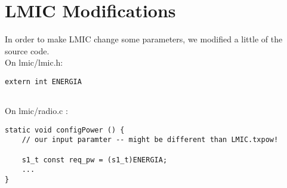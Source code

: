 
\chapter{LMIC Modifications} 
\label{chap:appendixA}



In order to make LMIC change some parameters, we modified a little of the source code.\\
On lmic/lmic.h:
\begin{verbatim}
extern int ENERGIA
    
\end{verbatim}

On lmic/radio.c :
\begin{verbatim}
static void configPower () {
    // our input paramter -- might be different than LMIC.txpow!
    
    s1_t const req_pw = (s1_t)ENERGIA;
    ...
}
\end{verbatim}